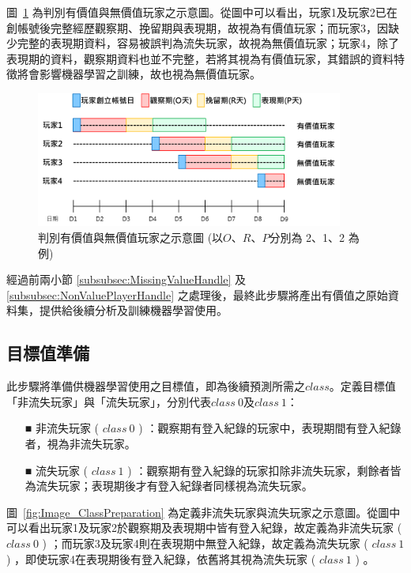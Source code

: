 圖~\ref{fig:Image_DataCleaning} 為判別有價值與無價值玩家之示意圖。從圖中可以看出，玩家1及玩家2已在創帳號後完整經歷觀察期、挽留期與表現期，故視為有價值玩家；而玩家3，因缺少完整的表現期資料，容易被誤判為流失玩家，故視為無價值玩家；玩家4，除了表現期的資料，觀察期資料也並不完整，若將其視為有價值玩家，其錯誤的資料特徵將會影響機器學習之訓練，故也視為無價值玩家。

\begin{figure}[!htb]
  \begin{center}
    \includegraphics[width=0.9\textwidth]{figures/Image_DataCleaning.png}
    \caption[判別有價值與無價值玩家之示意圖]{判別有價值與無價值玩家之示意圖 (以$O$、$R$、$P$分別為 2、1、2 為例) }
    \label{fig:Image_DataCleaning}
  \end{center}
\end{figure}

經過前兩小節 \ref{subsubsec:MissingValueHandle} 及 \ref{subsubsec:NonValuePlayerHandle} 之處理後，最終此步驟將產出有價值之原始資料集，提供給後續分析及訓練機器學習使用。

\subsection{目標值準備}
\label{subsec:ClassPreparation}

此步驟將準備供機器學習使用之目標值，即為後續預測所需之$class$。定義目標值「非流失玩家」與「流失玩家」，分別代表$class\ 0$及$class\ 1$：

\begin{itemize}
  \item [■] 非流失玩家 ( $class\ 0$ ) ：觀察期有登入紀錄的玩家中，表現期間有登入紀錄者，視為非流失玩家。
  \item [■] 流失玩家 ( $class\ 1$ ) ：觀察期有登入紀錄的玩家扣除非流失玩家，剩餘者皆為流失玩家；表現期後才有登入紀錄者同樣視為流失玩家。
\end{itemize}

圖~\ref{fig:Image_ClassPreparation} 為定義非流失玩家與流失玩家之示意圖。從圖中可以看出玩家1及玩家2於觀察期及表現期中皆有登入紀錄，故定義為非流失玩家 ( $class\ 0$ ) ；而玩家3及玩家4則在表現期中無登入紀錄，故定義為流失玩家 ( $class\ 1$ ) ，即使玩家4在表現期後有登入紀錄，依舊將其視為流失玩家 ( $class\ 1$ ) 。

